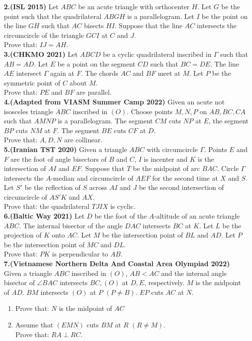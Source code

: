 \documentclass[a4paper,12pt,twoside]{book}
\begin{document}
{\textbf{2.(ISL 2015)} Let $ABC$ be an acute triangle with orthocenter $H$. Let $G$ be the point such that the quadrilateral $ABGH$ is a parallelogram. Let $I$ be the point on the line $GH$ such that $AC$ bisects $HI$. Suppose that the line $AC$ intersects the circumcircle of the triangle $GCI$ at $C$ and $J$.\\Prove that: $IJ = AH$.\\

\textbf{3.(CHKMO 2021)} Let $ABCD$ be a cyclic quadrilateral inscribed in $\Gamma$ such that $AB=AD$. Let $E$ be a point on the segment $CD$ such that $BC=DE$. The line $AE$ intersect $\Gamma$ again at $F$. The chords $AC$ and $BF$ meet at $M$. Let $P$ be the symmetric point of $C$ about $M$.\\
Prove that: $PE$ and $BF$ are parallel.\\

\textbf{4.(Adapted from VIASM Summer Camp 2022)} Given an acute not isosceles triangle $ABC$ inscribed in $(O)$. Choose points $M,N,P$ on $AB,BC,CA$ such that $AMNP$ is a parallelogram. The segment $CM$ cuts $NP$ at $E$, the segment $BP$ cuts $NM$ at $F$. The segment $BE$ cuts $CF$ at $D$.\\
Prove that: $A,D,N$ are collinear.\\

\textbf{5.(Iranian TST 2020)} Given a triangle $ABC$ with circumcircle $\Gamma$. Points $E$ and $F$ are the foot of angle bisectors of $B$ and $C$, $I$ is incenter and $K$ is the intersection of $AI$ and $EF$. Suppose that $T$ be the midpoint of arc $BAC$. Circle $\Gamma$ intersects the $A$-median and circumcircle of $AEF$ for the second time at $X$ and $S$. Let $S'$ be the reflection of $S$ across $AI$ and $J$ be the second intersection of circumcircle of $AS'K$ and $AX$.
\\Prove that: the quadrilateral $TJIX$ is cyclic.\\

\textbf{6.(Baltic Way 2021)} Let $D$ be the foot of the $A$-altitude of an acute triangle $ABC$. The internal bisector of the angle $DAC$ intersects $BC$ at $K$. Let $L$ be the projection of $K$ onto $AC$. Let $M$ be the intersection point of $BL$ and $AD$. Let $P$ be the intersection point of $MC$ and $DL$.
\\Prove that: $PK$ is perpendicular to $AB$.\\

\textbf{7.(Vietnamese Northern Delta And Coastal Area Olympiad 2022)} Given a triangle $ABC$ inscribed in $(O)$, $AB<AC$ and the internal angle bisector of $\angle{BAC}$ intersects $BC, (O)$ at $D,E$, respectively. $M$ is the midpoint of $AD$. $BM$ intersects $(O)$ at $P$ $(P\ne B)$. $EP$ cuts $AC$ at $N$.
\begin{enumerate}
	\item Prove that: $N$ is the midpoint of $AC$
	\item Assume that $(EMN)$ cuts $BM$ at $R$ $(R\ne M)$.\\Prove that: $RA\perp RC$.
\end{enumerate}

}
\end{document}
